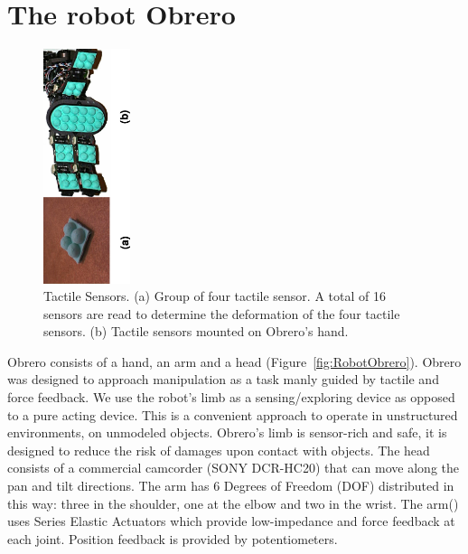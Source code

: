 
\section{The robot Obrero}
\label{sec:platform}


\begin{figure}[tbp]
\centerline{
\includegraphics[width=1.0in, angle=270 ]{./figures/Tactiles.eps}
} \caption{Tactile Sensors. (a) Group of four tactile sensor. A
total of 16 sensors are read to determine the deformation of the
four tactile sensors. (b) Tactile sensors mounted on Obrero's
hand.} \label{fig:TactileSensors}
\end{figure}

Obrero \cite{obrero} consists of a hand, an arm and a head
(Figure~\ref{fig:RobotObrero}). Obrero was designed to approach
manipulation as a task manly guided by tactile and force feedback.
We use the robot's limb as a sensing/exploring device as opposed
to a pure acting device. This is a convenient approach to operate
in unstructured environments, on unmodeled objects. Obrero's limb
is sensor-rich and safe, it is designed to reduce the risk of
damages upon contact with objects. The head consists of a
commercial camcorder (SONY DCR-HC20) that can move along the pan
and tilt directions. The arm has 6 Degrees of Freedom (DOF)
distributed in this way: three in the shoulder, one at the elbow
and two in the wrist. The arm(\cite{AaronArm}) uses Series Elastic
Actuators \cite{williamson95series} which provide low-impedance
and force feedback at each joint. Position feedback is provided by
potentiometers.

